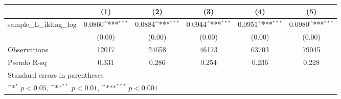 {
\def\sym#1{\ifmmode^{#1}\else\(^{#1}\)\fi}
\begin{tabular}{l*{5}{c}}
\hline\hline
          &\multicolumn{1}{c}{(1)}         &\multicolumn{1}{c}{(2)}         &\multicolumn{1}{c}{(3)}         &\multicolumn{1}{c}{(4)}         &\multicolumn{1}{c}{(5)}         \\
\hline
sample\_L\_iktlag\_log&   0.0860\sym{***}&   0.0884\sym{***}&   0.0944\sym{***}&   0.0951\sym{***}&   0.0980\sym{***}\\
          &   (0.00)         &   (0.00)         &   (0.00)         &   (0.00)         &   (0.00)         \\
\hline
Observations&    12017         &    24658         &    46173         &    63703         &    79045         \\
Pseudo R-sq&    0.331         &    0.286         &    0.254         &    0.236         &    0.228         \\
\hline\hline
\multicolumn{6}{l}{\footnotesize Standard errors in parentheses}\\
\multicolumn{6}{l}{\footnotesize \sym{*} \(p<0.05\), \sym{**} \(p<0.01\), \sym{***} \(p<0.001\)}\\
\end{tabular}
}
